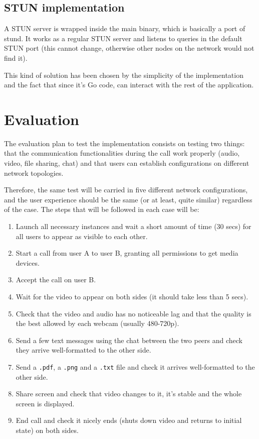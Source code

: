 \documentclass[paper=a4, fontsize=11pt]{scrartcl} %
\numberwithin{equation}{section} %
\numberwithin{figure}{section} %
\numberwithin{table}{section} %
\begin{document}
\subsection{STUN implementation}

A STUN server is wrapped inside the main binary, which is basically a port of stund. It works as a regular STUN server and listens to queries in the default STUN port (this cannot change, otherwise other nodes on the network would not find it).

This kind of solution has been chosen by the simplicity of the implementation and the fact that since it's Go code, can interact with the rest of the application.

\section{Evaluation}

The evaluation plan to test the implementation consists on testing two things: that the communication functionalities during the call work properly (audio, video, file sharing, chat) and that users can establish configurations on different network topologies.

Therefore, the same test will be carried in five different network configurations, and the user experience should be the same (or at least, quite similar) regardless of the case. The steps that will be followed in each case will be:

\begin{enumerate}
	\item Launch all necessary instances and wait a short amount of time (30 secs) for all users to appear as visible to each other.
	\item Start a call from user A to user B, granting all permissions to get media devices.
	\item Accept the call on user B.
	\item Wait for the video to appear on both sides (it should take less than 5 secs).
	\item Check that the video and audio has no noticeable lag and that the quality is the best allowed by each webcam (usually 480-720p).
	\item Send a few text messages using the chat between the two peers and check they arrive well-formatted to the other side.
	\item Send a \verb|.pdf|, a \verb|.png| and a \verb|.txt| file and check it arrives well-formatted to the other side.
	\item Share screen and check that video changes to it, it's stable and the whole screen is displayed.
	\item End call and check it nicely ends (shuts down video and returns to initial state) on both sides.
\end{enumerate}
\end{document}
